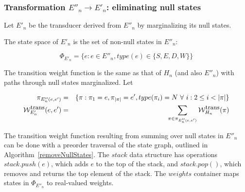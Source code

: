 \documentclass{article}
\newcommand{\seclabel}[1]{\label{sec.#1}}
\newcommand\States{\Phi}
\newcommand\statesof[1]{\States_{#1}}
\newcommand\weight{{\cal W}}
\newcommand\weightfunof[1]{\weight_{#1}}
\newcommand\transweightfun[1]{\weightfunof{#1}^{\mbox{\small trans}}}
\begin{document}
\subsubsection{Transformation $E''_n \to E'_n$: eliminating null states}
\seclabel{NullStateElim}
Let $E'_n$ be the transducer derived from $E''_n$ by marginalizing its null states.  

The state space of $E'_n$ is the set of non-null states in $E''_n$:

\[
\statesof{E'_n} = \{ e : e \in E''_n, type(e) \in \{S,E,D,W\} \}
\]

The transition weight function is the same as that of $H_n$ (and also $E''_n$) with paths through null states marginalized.
Let 

\begin{eqnarray*}
\pi_{ {E''_n}(e,e')} &  =  & \{  \pi: \pi_1 =e, \pi_{|\pi|}=e', type(\pi_i) = N\ \forall\ i: 2 \leq i < |\pi| \} \\
 \transweightfun{E'_n}(e,e') & = & \sum_{\pi \in \pi_{E''_n(e,e') }} \transweightfun{H_n}(\pi) 
\end{eqnarray*}

The transition weight function resulting from summing over null states in $E''_n$ can be done with a preorder traversal of the state graph, outlined in Algorithm~\ref{removeNullStates}.   The $stack$ data structure has operations $stack.push(e)$, which adds $e$ to the top of the stack, and $stack.pop()$, which removes and returns the top element of the stack.  The $weights$ container maps states in $\statesof{E''_n}$ to real-valued weights.  
\end{document}
